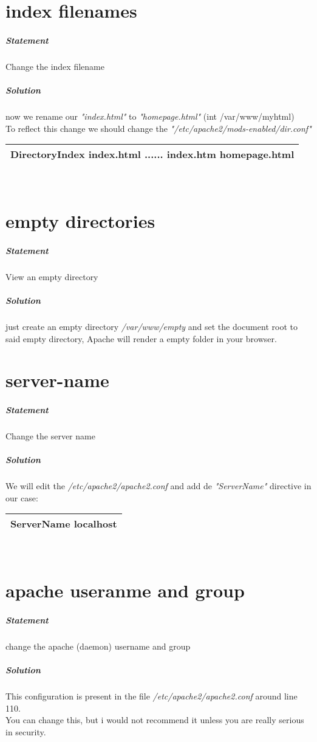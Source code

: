 \documentclass[a4paper,10pt]{article}
\begin{document}
\section{index filenames}
\subparagraph{Statement}
Change the index filename
\subparagraph{Solution}
now we rename our {\it "index.html"} to {\it "homepage.html"} (int /var/www/myhtml)\\
To reflect this change we should change the {\it "/etc/apache2/mods-enabled/dir.conf"}
\vspace{0.5cm}\\\begin{tabular}{|l|}\hline
DirectoryIndex index.html ...... index.htm homepage.html
\\\hline\end{tabular}\vspace{0.5cm}\\


\section{empty directories}
\subparagraph{Statement}
View an empty directory
\subparagraph{Solution}
just create an empty directory {\it /var/www/empty} and set the document root to said empty directory, Apache will render a empty folder in your browser.
\pagebreak

\section{server-name}
\subparagraph{Statement}
Change the server name
\subparagraph{Solution}
We will edit the {\it /etc/apache2/apache2.conf} and add de {\it "ServerName"} directive in our case:
\vspace{0.5cm}\\\begin{tabular}{|l|}\hline
ServerName localhost
\\\hline\end{tabular}\vspace{0.5cm}\\

\section{apache useranme and group}
\subparagraph{Statement}
change the apache (daemon) username and group
\subparagraph{Solution}
This configuration is present in the file {\it /etc/apache2/apache2.conf} around line 110.\\
You can change this, but i would not recommend it unless you are really serious in security.
\end{document}
